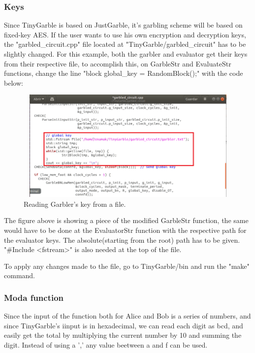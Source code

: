 \begin{refsection}
\subsubsection{Keys}

Since TinyGarble is based on JustGarble, it's garbling scheme will be based on fixed-key AES. If the user wants to use his own encryption and decryption keys, the "garbled\_circuit.cpp" file located at "TinyGarble/garbled\_circuit" has to be slightly changed. For this example, both the garbler and evaluator get their keys from their respective file, to accomplish this, on GarbleStr and EvaluateStr functions, change the line "block global\_key =  RandomBlock();" with the code below:

\begin{figure}[H]
	\centering
	\includegraphics[width=1\textwidth, height=5.5cm]{./sdf/secure_multiparty_computation/figures/key_file.png}
    \caption{Reading Garbler's key from a file.}\label{fig:key_file}
\end{figure}

The figure above is showing a piece of the modified GarbleStr function, the same would have to be done at the EvaluatorStr function with the respective path for the evaluator keys. The absolute(starting from the root) path has to be given. "\#Include <fstream>" is also needed at the top of the file.

To apply any changes made to the file, go to TinyGarble/bin and run the "make" command.

\subsubsection{Moda function}

Since the input of the function both for Alice and Bob is a series of numbers, and since TinyGarble's iinput is in hexadecimal, we can read each digit as bcd, and easily get the total by multiplying the current number by 10 and summing the digit. Instead of using a ',' any value beetween a and f can be used.


\end{refsection}
